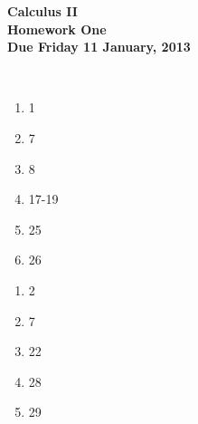 \documentclass[12pt]{article}
\begin{document}
\pagestyle{empty}
 
\begin{center}
{\large {\bf Calculus II}}\\
\medskip
{\large {\bf Homework One}}\\
\medskip
{ {\bf Due Friday 11 January, 2013}}\\ 
\end{center}

\hspace{2mm}\\


\begin{enumerate}
\setlength{\itemsep}{-1mm}
  \item 1
  \item 7
  \item 8
  \item 17-19
  \item 25
  \item 26 

\end{enumerate}



\begin{enumerate}
\setlength{\itemsep}{-1mm}
  \item 2
  \item 7
  \item 22
  \item 28
  \item 29

\end{enumerate}
\end{document}
